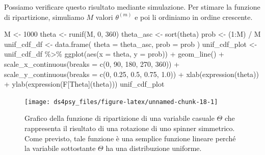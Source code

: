 \documentclass[
  11pt,
]{krantz}
\makeatletter
\newenvironment{Shaded}{\begin{snugshade}}{\end{snugshade}}
\newcommand{\AttributeTok}[1]{\textcolor[rgb]{0.61,0.61,0.61}{#1}}
\newcommand{\DecValTok}[1]{\textcolor[rgb]{0.06,0.06,0.06}{#1}}
\newcommand{\FloatTok}[1]{\textcolor[rgb]{0.06,0.06,0.06}{#1}}
\newcommand{\FunctionTok}[1]{\textcolor[rgb]{0,0,0}{#1}}
\newcommand{\NormalTok}[1]{#1}
\newcommand{\OtherTok}[1]{\textcolor[rgb]{0.37,0.37,0.37}{#1}}
\newcommand{\SpecialCharTok}[1]{\textcolor[rgb]{0,0,0}{#1}}
\newenvironment{kframe}{%
\medskip{}
\setlength{\fboxsep}{.8em}
 \def\at@end@of@kframe{}%
 \ifinner\ifhmode%
  \def\at@end@of@kframe{\end{minipage}}%
  \begin{minipage}{\columnwidth}%
 \fi\fi%
 \def\FrameCommand##1{\hskip\@totalleftmargin \hskip-\fboxsep
 \colorbox{shadecolor}{##1}\hskip-\fboxsep
     \hskip-\linewidth \hskip-\@totalleftmargin \hskip\columnwidth}%
 \MakeFramed {\advance\hsize-\width
   \@totalleftmargin\z@ \linewidth\hsize
   \@setminipage}}%
 {\par\unskip\endMakeFramed%
 \at@end@of@kframe}
\renewenvironment{Shaded}{\begin{kframe}}{\end{kframe}}
\theoremstyle{definition}
\theoremstyle{definition}
\theoremstyle{definition}
\theoremstyle{definition}
\theoremstyle{remark}
\makeatother
\begin{document}
Possiamo verificare questo risultato mediante simulazione. Per stimare la funzione di ripartizione, simuliamo \(M\) valori \(\theta^{(m)}\) e poi li ordiniamo in ordine crescente.

\begin{Shaded}
\begin{Highlighting}[]
\NormalTok{M }\OtherTok{\textless{}{-}} \DecValTok{1000}
\NormalTok{theta }\OtherTok{\textless{}{-}} \FunctionTok{runif}\NormalTok{(M, }\DecValTok{0}\NormalTok{, }\DecValTok{360}\NormalTok{)}
\NormalTok{theta\_asc }\OtherTok{\textless{}{-}} \FunctionTok{sort}\NormalTok{(theta)}
\NormalTok{prob }\OtherTok{\textless{}{-}}\NormalTok{ (}\DecValTok{1}\SpecialCharTok{:}\NormalTok{M) }\SpecialCharTok{/}\NormalTok{ M}
\NormalTok{unif\_cdf\_df }\OtherTok{\textless{}{-}} \FunctionTok{data.frame}\NormalTok{(}
  \AttributeTok{theta =}\NormalTok{ theta\_asc,}
  \AttributeTok{prob =}\NormalTok{ prob}
\NormalTok{)}
\NormalTok{unif\_cdf\_plot }\OtherTok{\textless{}{-}}
\NormalTok{  unif\_cdf\_df }\SpecialCharTok{\%\textgreater{}\%}
  \FunctionTok{ggplot}\NormalTok{(}\FunctionTok{aes}\NormalTok{(}\AttributeTok{x =}\NormalTok{ theta, }\AttributeTok{y =}\NormalTok{ prob)) }\SpecialCharTok{+}
  \FunctionTok{geom\_line}\NormalTok{() }\SpecialCharTok{+}
  \FunctionTok{scale\_x\_continuous}\NormalTok{(}\AttributeTok{breaks =} \FunctionTok{c}\NormalTok{(}\DecValTok{0}\NormalTok{, }\DecValTok{90}\NormalTok{, }\DecValTok{180}\NormalTok{, }\DecValTok{270}\NormalTok{, }\DecValTok{360}\NormalTok{)) }\SpecialCharTok{+}
  \FunctionTok{scale\_y\_continuous}\NormalTok{(}\AttributeTok{breaks =} \FunctionTok{c}\NormalTok{(}\DecValTok{0}\NormalTok{, }\FloatTok{0.25}\NormalTok{, }\FloatTok{0.5}\NormalTok{, }\FloatTok{0.75}\NormalTok{, }\FloatTok{1.0}\NormalTok{)) }\SpecialCharTok{+}
  \FunctionTok{xlab}\NormalTok{(}\FunctionTok{expression}\NormalTok{(theta)) }\SpecialCharTok{+}
  \FunctionTok{ylab}\NormalTok{(}\FunctionTok{expression}\NormalTok{(F[Theta](theta)))}
\NormalTok{unif\_cdf\_plot}
\end{Highlighting}
\end{Shaded}

\begin{figure}[h]

{\centering \texttt{[image: ds4psy\_files/figure-latex/unnamed-chunk-18-1]} 

}

\caption{Grafico della funzione di ripartizione di una variabile casuale $\Theta$ che rappresenta il risultato di una rotazione di uno spinner simmetrico. Come previsto, tale funzione è una semplice funzione lineare perché la variabile sottostante $\Theta$ ha una distribuzione uniforme.}\label{fig:unnamed-chunk-18}
\end{figure}
\end{document}
